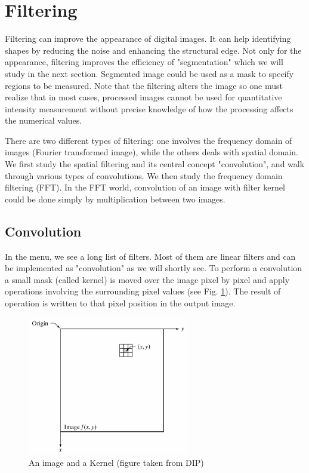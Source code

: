
\section{Filtering}
\label{sec:Filtering}
Filtering can improve the appearance of digital images. It can help  identifying shapes by reducing the noise and enhancing the
structural edge. Not only for the appearance, filtering improves the
efficiency of "segmentation" which we
will study in the next section. Segmented image could be used as a mask
to specify regions to be measured. Note that the filtering alters the
image so one must realize that in most cases, processed images cannot
be used for quantitative intensity measurement without precise
knowledge of how the processing affects the numerical values. 

There are two different types of filtering: one involves the frequency
domain of images (Fourier transformed image), while the others deals
with spatial domain. We first study the spatial filtering and
its central concept "convolution", and
walk through various types of convolutions. We then study the frequency
domain filtering (FFT). In the FFT world, convolution of an image with
filter kernel could be done simply by multiplication between two
images. 



\subsection{Convolution}\label{subsecConvolution}
\label{sec:Convolution}
In the \ijmenu{[Process]} menu, we see a long list of
filters. Most of them are linear filters and can be implemented as "convolution" as we will shortly see. 
To perform a convolution a small mask (called kernel) is moved over the image pixel by pixel and apply operations involving the surrounding pixel values (see Fig.
\ref{fig:img38}). The result of operation is written to that pixel position
in the output image. 

\begin{figure}[htbp]
\begin{center}
\includegraphics[width=7cm]{fig/CMCIBasicCourse201102-img38.png}
\caption{ An image and a Kernel (figure taken from DIP)}
\label{fig:img38}
\end{center}
\end{figure}


